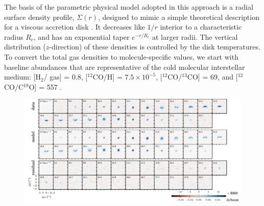 \documentclass[twocolumn]{aastex61}
\begin{document}
The basis of the parametric physical model adopted in this approach is a radial surface density profile, $\Sigma(r)$, designed to mimic a simple theoretical description for a viscous accretion disk \citep{lyndenbell74,hartmann98}.  It decreases like $1/r$ interior to a characteristic radius $R_c$, and has an exponential taper $e^{-r/R_c}$ at larger radii.  The vertical distribution ($z$-direction) of these densities is controlled by the disk temperatures. To convert the total gas densities to molecule-specific values, we start with baseline abundances that are representative of the cold molecular interstellar medium: [H$_2$/ gas] = 0.8, [$^{12}$CO/H] = $7.5 \times 10^{-5}$, [$^{12}$CO/$^{13}$CO] = 69, and [$^{12}$CO/C$^{18}$O] = 557 \citep[e.g.,][]{henkel94,prantzos96}.

\begin{figure}[ht!]
\begin{center}
  \includegraphics{chmaps_C18O.pdf}
  \end{center}
\end{figure}

\end{document}

